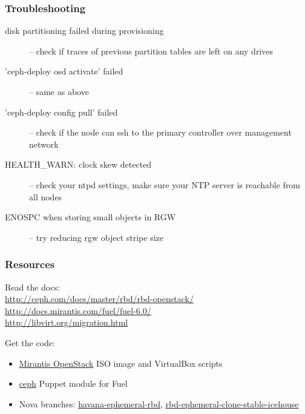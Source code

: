 \documentclass[hyperref=unicode,utf8,xcolor=pst,aspectratio=169]{beamer}
\begin{document}
\begin{frame}
	\frametitle{Troubleshooting}
	\begin{description}
		\item[disk partitioning failed during provisioning] --
			check if traces of previous partition tables are
			left on any drives
		\item['ceph-deploy osd activate' failed] -- same as above
		\item['ceph-deploy config pull' failed] -- check if the
			node can ssh to the primary controller over
			management network
		\item[HEALTH\_WARN: clock skew detected] -- check your
			ntpd settings, make sure your NTP server is
			reachable from all nodes
		\item[ENOSPC when storing small objects in RGW] -- try
			reducing rgw object stripe size
	\end{description}
\end{frame}

\begin{frame}
	\frametitle{Resources}
	Read the docs:\\
	\url{http://ceph.com/docs/master/rbd/rbd-openstack/}\\
	\url{http://docs.mirantis.com/fuel/fuel-6.0/}\\
	\url{http://libvirt.org/migration.html}

	\vspace{2ex}
	Get the code:\\
	\begin{itemize}
		\item \href{http://software.mirantis.com/}{Mirantis OpenStack} ISO image and VirtualBox scripts\\
		\item \href{https://github.com/stackforge/fuel-library/tree/master/deployment/puppet/ceph}{ceph} Puppet module for Fuel\\
		\item Nova branches: \href{https://github.com/jdurgin/nova/commits/havana-ephemeral-rbd}{havana-ephemeral-rbd},
			\href{https://github.com/angdraug/nova/commits/rbd-ephemeral-clone-stable-icehouse}{rbd-ephemeral-clone-stable-icehouse}
	\end{itemize}
\end{frame}
\end{document}
